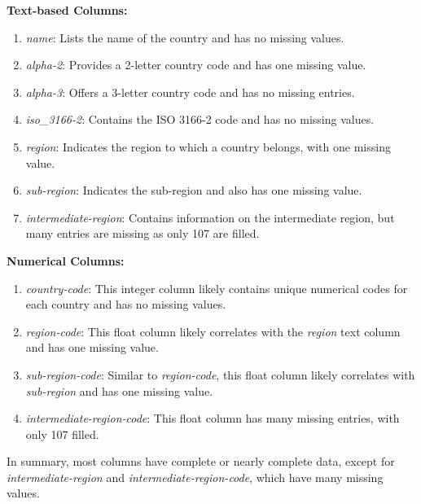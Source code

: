             \textbf{Text-based Columns:}
            \begin{enumerate}
                \item \textit{name}: Lists the name of the country and has no missing values.
                \item \textit{alpha-2}: Provides a 2-letter country code and has one missing value.
                \item \textit{alpha-3}: Offers a 3-letter country code and has no missing entries.
                \item \textit{iso\_3166-2}: Contains the ISO 3166-2 code and has no missing values.
                \item \textit{region}: Indicates the region to which a country belongs, with one missing value.
                \item \textit{sub-region}: Indicates the sub-region and also has one missing value.
                \item \textit{intermediate-region}: Contains information on the intermediate region, but many entries are missing as only 107 are filled.
            \end{enumerate}

            \textbf{Numerical Columns:}
            \begin{enumerate}
                \item \textit{country-code}: This integer column likely contains unique numerical codes for each country and has no missing values.
                \item \textit{region-code}: This float column likely correlates with the \textit{region} text column and has one missing value.
                \item \textit{sub-region-code}: Similar to \textit{region-code}, this float column likely correlates with \textit{sub-region} and has one missing value.
                \item \textit{intermediate-region-code}: This float column has many missing entries, with only 107 filled.
            \end{enumerate}

            In summary, most columns have complete or nearly complete data, except for \textit{intermediate-region} and \textit{intermediate-region-code}, which have many missing values.

        \subsection{\duExploreTheData}

